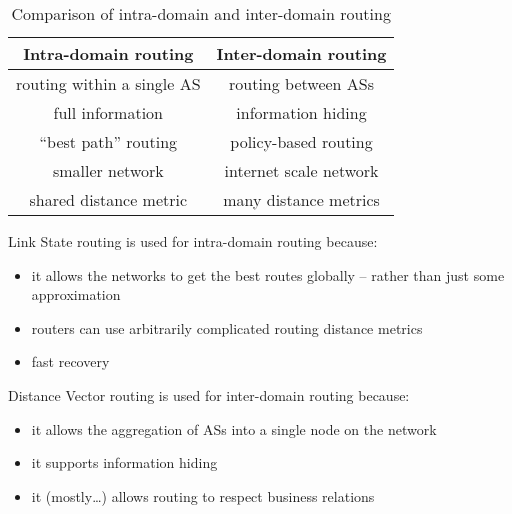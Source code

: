 \documentclass[10pt,\jkfside,a4paper]{article}
\begin{document}
\begin{enumerate}
\begin{table}[h]
        \begin{tabular}{c|c}

            Intra-domain routing & Inter-domain routing \\

            \hline

            routing within a single AS & routing between ASs \\

            full information & information hiding \\

            ``best path'' routing & policy-based routing \\

            smaller network & internet scale network \\

            shared distance metric & many distance metrics \\

        \end{tabular}

        \caption{Comparison of intra-domain and inter-domain routing}

    \end{table}

    Link State routing is used for intra-domain routing because:

    \begin{itemize}

        \item it allows the networks to get the best routes globally -- rather than just some approximation

        \item routers can use arbitrarily complicated routing distance metrics

        \item fast recovery

    \end{itemize}

    Distance Vector routing is used for inter-domain routing because:

    \begin{itemize}

        \item it allows the aggregation of ASs into a single node on the network

        \item it supports information hiding

        \item it (mostly\ldots) allows routing to respect business relations


\end{itemize}
\end{enumerate}
\end{document}
